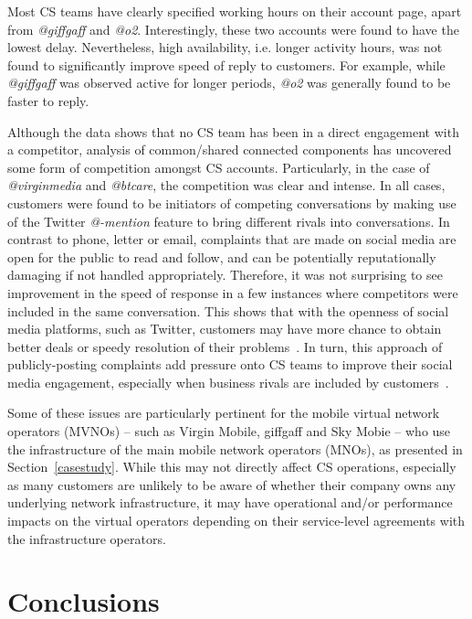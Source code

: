 \documentclass[sigconf]{acmart}
\begin{document}
{Most CS teams have clearly specified working hours on their account
page, apart from {\emph{@giffgaff}} and {\emph{@o2}}. Interestingly,
these two accounts were found to have the lowest delay. Nevertheless,
high availability, i.e. longer activity hours, was not found to
significantly improve speed of reply to customers. For example, while
{\emph{@giffgaff}} was observed active for longer periods, {\emph{@o2}}
was generally found to be faster to reply.

Although the data shows that no CS team has been in a direct
engagement with a competitor, analysis of common/shared connected
components has uncovered some form of competition amongst CS
accounts. Particularly, in the case of {\emph{@virginmedia}} and
{\emph{@btcare}}, the competition was clear and intense. In all cases,
customers were found to be initiators of competing conversations by
making use of the Twitter {\emph{@-mention}} feature to bring
different rivals into conversations. In contrast to phone, letter or
email, complaints that are made on social media are open for the
public to read and follow, and can be potentially reputationally
damaging if not handled appropriately. Therefore, it was not
surprising to see improvement in the speed of response in a few
instances where competitors were included in the same
conversation. This shows that with the openness of social media
platforms, such as Twitter, customers may have more chance to obtain
better deals or speedy resolution of their
problems~\cite{einwiller+steilen:2015}. In turn, this approach of
publicly-posting complaints add pressure onto CS teams to improve
their social media engagement, especially when business rivals are
included by customers~\cite{gregoire-et-al:2015}.

Some of these issues are particularly pertinent for the mobile virtual
network operators (MVNOs) -- such as Virgin Mobile, giffgaff and Sky
Mobie -- who use the infrastructure of the main mobile network
operators (MNOs), as presented in Section~\ref{casestudy}. While this
may not directly affect CS operations, especially as many customers
are unlikely to be aware of whether their company owns any underlying
network infrastructure, it may have operational and/or performance
impacts on the virtual operators depending on their service-level
agreements with the infrastructure operators.

\section{Conclusions}\label{conclusions}

}
\end{document}
